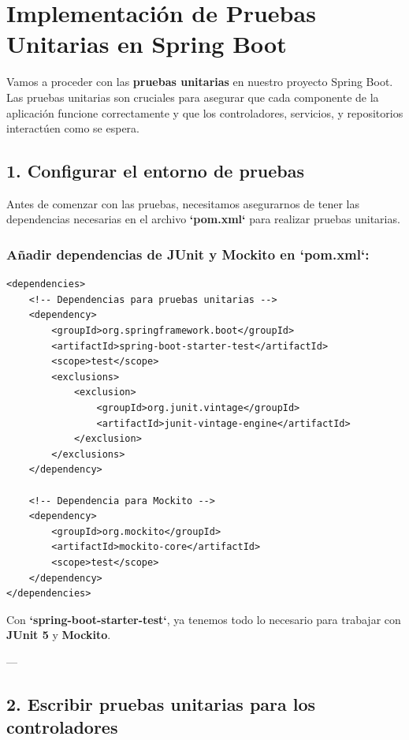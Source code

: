 \documentclass[11pt]{article}
\begin{document}
\section{Implementación de Pruebas Unitarias en Spring Boot}
\label{sec:orgdb75674}

Vamos a proceder con las \textbf{\textbf{pruebas unitarias}} en nuestro proyecto Spring Boot. Las pruebas unitarias son cruciales para asegurar que cada componente de la aplicación funcione correctamente y que los controladores, servicios, y repositorios interactúen como se espera.

\subsection{1. Configurar el entorno de pruebas}
\label{sec:org4a64a47}

Antes de comenzar con las pruebas, necesitamos asegurarnos de tener las dependencias necesarias en el archivo \textbf{\textbf{`pom.xml`}} para realizar pruebas unitarias.

\subsubsection{Añadir dependencias de JUnit y Mockito en `pom.xml`:}
\label{sec:org3e00681}

\begin{verbatim}
<dependencies>
    <!-- Dependencias para pruebas unitarias -->
    <dependency>
        <groupId>org.springframework.boot</groupId>
        <artifactId>spring-boot-starter-test</artifactId>
        <scope>test</scope>
        <exclusions>
            <exclusion>
                <groupId>org.junit.vintage</groupId>
                <artifactId>junit-vintage-engine</artifactId>
            </exclusion>
        </exclusions>
    </dependency>

    <!-- Dependencia para Mockito -->
    <dependency>
        <groupId>org.mockito</groupId>
        <artifactId>mockito-core</artifactId>
        <scope>test</scope>
    </dependency>
</dependencies>
\end{verbatim}

Con \textbf{\textbf{`spring-boot-starter-test`}}, ya tenemos todo lo necesario para trabajar con \textbf{\textbf{JUnit 5}} y \textbf{\textbf{Mockito}}.

---

\subsection{2. Escribir pruebas unitarias para los controladores}
\label{sec:orgd9aa713}
\end{document}
